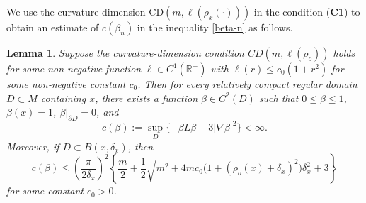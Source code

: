 \documentclass[11pt,twoside, reqno]{article}
\newcommand\1{\mathbbm{1}}
\newtheorem{lemma}[theorem]{Lemma}
\theoremstyle{definition}
\numberwithin{equation}{section}
\begin{document}
We use the   curvature-dimension CD$(m,\ell(\rho_x(\cdot)))$ in the condition (\textbf{C1}) to  obtain an estimate of $c(\beta_n)$ in the inequality \eqref{beta-n} as follows.
\begin{lemma} \label{lem3.3}
Suppose  the curvature-dimension condition
\(CD(m,\ell(\rho_o))\) holds for some non‑negative function \( \ell \in C^1(\mathbb{R}^+) \) with \( \ell(r)\leq c_0(1+r^2) \) for some non‑negative constant $c_0$. Then for every relatively compact regular domain
\(D\subset M\) containing \(x\), there exists a function
\(\beta\in C^2(D)\) such that \(0\leq \beta\leq1\),
\(\beta(x)=1\), \(\beta|_{\partial D}=0\), and
\[
        c(\beta):=\sup_D\{-\beta L\beta+3|\nabla\beta|^2\}<\infty.
\]
Moreover, if \(D\subset B(x,\delta_x)\), then
\[
        c(\beta)
        \leq
        \left(\frac{\pi}{2\delta_x}\right)^2
        \left\{
        \frac{m}{2}+ \frac{1}{2}
        \sqrt{
        m^2+
        4mc_0\bigl(1+(\rho_o(x)+\delta_x)^2\bigr)\delta_x^2}
        +3
        \right\}
\]
for some constant \(c_0>0\).
\end{lemma}
\end{document}

